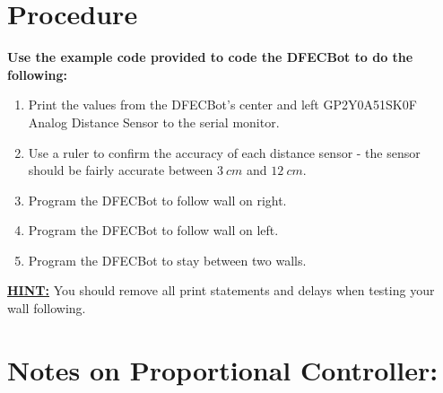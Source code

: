 \documentclass{handout}
\begin{document}
	\section{Procedure}
	\textbf{Use the example code provided to code the DFECBot to do the following:}
		
	\begin{enumerate}
		\item Print the values from the DFECBot's center and left GP2Y0A51SK0F Analog Distance Sensor to the serial monitor.
		\item Use a ruler to confirm the accuracy of each distance sensor - the sensor should be fairly accurate between $3\ cm$ and $12\ cm$.
		\item Program the DFECBot to follow wall on right.
		\item Program the DFECBot to follow wall on left.
		\item Program the DFECBot to stay between two walls.
	\end{enumerate} 	
	{\large \textbf{\underline{HINT:}}} You should remove all print statements and delays when testing your wall following.
	\section{Notes on Proportional Controller:}
	
\end{document}
